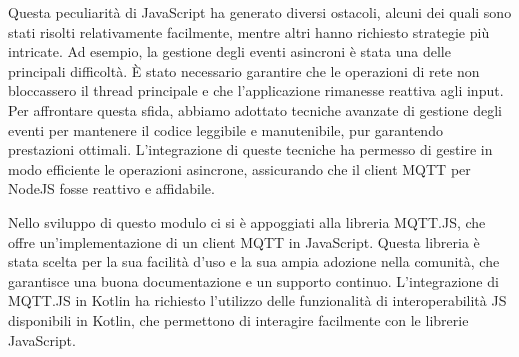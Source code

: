 \documentclass[12pt,a4paper,openright,twoside]{book}
\begin{document}
Questa peculiarità di JavaScript ha generato diversi ostacoli, alcuni dei quali sono stati risolti relativamente facilmente, mentre altri hanno richiesto strategie più intricate. 
Ad esempio, la gestione degli eventi asincroni è stata una delle principali difficoltà. È stato necessario garantire che le operazioni di rete non bloccassero il thread principale 
e che l'applicazione rimanesse reattiva agli input. Per affrontare questa sfida, abbiamo adottato tecniche avanzate di gestione degli eventi per mantenere il codice leggibile 
e manutenibile, pur garantendo prestazioni ottimali. L'integrazione di queste tecniche ha permesso di gestire in modo efficiente le operazioni asincrone, assicurando che il 
client \ac{MQTT} per NodeJS fosse reattivo e affidabile.

Nello sviluppo di questo modulo ci si è appoggiati alla libreria MQTT.JS, che offre un'implementazione di un client \ac{MQTT} in JavaScript. 
Questa libreria è stata scelta per la sua facilità d'uso e la sua ampia adozione nella comunità, che garantisce una buona documentazione e un supporto continuo. 
L'integrazione di MQTT.JS in Kotlin ha richiesto l'utilizzo delle funzionalità di interoperabilità \ac{JS} disponibili in Kotlin, che permettono di interagire 
facilmente con le librerie JavaScript.
\end{document}
